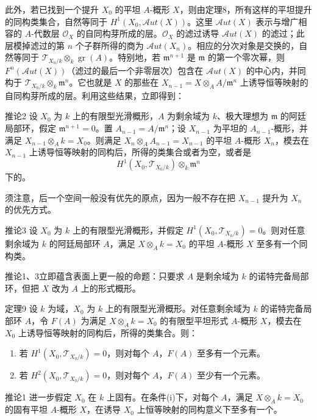 此外，若已找到一个提升 $X_0$ 的平坦 $A$-概形 $X$，则由定理8，所有这样的平坦提升的同构类集合，自然等同于 $H^1(X_0,\mathcal A ut(X))$。这里 $\mathcal A ut(X)$ 表示与增广相容的 $A$-代数层 $\mathcal O_X$ 的自同构芽所成的层。$\mathcal O_X$ 的滤过诱导 $\mathcal A ut(X)$ 的滤过；此层模掉滤过的第 $n$ 个子群所得的商为 $\mathcal A ut(X_n)$。相应的分次对象是交换的，自然等同于 $\mathcal T_{X_0/k}\otimes_k\operatorname{gr}(A)$。特别地，若 $\mathfrak m^{n+1}$ 是 $\mathfrak m$ 的第一个零次幂，则 $F^n(\mathcal A ut(X))$（滤过的最后一个非零层次）包含在 $\mathcal A ut(X)$ 的中心内，并同构于 $\mathcal T_{X_0/k}\otimes_k\mathfrak m^n$。它也就是 $X$ 的那些在 $X_{n-1}=X\otimes_A A/\mathfrak m^n$ 上诱导恒等映射的自同构芽所成的层。利用这些结果，立即得到：
\begin{statement}{推论2}
设 $X_0$ 为 $k$ 上的有限型光滑概形，$A$ 为剩余域为 $k$、极大理想为 $\mathfrak m$ 的阿廷局部环，假定 $\mathfrak m^{n+1}=0$。置 $A_{n-1}=A/\mathfrak m^n$；设 $X_{n-1}$ 为平坦的 $A_{n-1}$-概形，并满足 $X_{n-1}\otimes_Ak=X_0$。则满足 $X_n\otimes_A A_{n-1}=X_{n-1}$ 的平坦 $A$-概形 $X_n$，模去在 $X_{n-1}$ 上诱导恒等映射的同构后，所得的类集合或者为空，或者是
\[
H^1(X_0,\mathcal T_{X_0/k})\otimes_k\mathfrak m^n
\]
下的。
\end{statement}
须注意，后一个空间一般没有优先的原点，因为一般不存在把 $X_{n-1}$ 提升为 $X_n$ 的优先方式。
\begin{statement}{推论3}
设 $X_0$ 为 $k$ 上的有限型光滑概形，并假定 $H^1(X_0,\mathcal T_{X_0/k})=0$。则对任意剩余域为 $k$ 的阿廷局部环 $A$，满足 $X\otimes_Ak=X_0$ 的平坦 $A$-概形 $X$ 至多有一个同构类。
\end{statement}
推论1、3立即蕴含表面上更一般的命题：只要求 $A$ 是剩余域为 $k$ 的诺特完备局部环，但把 $X$ 改为 $A$ 上的形式概形。
\begin{statement}{定理9}
设 $k$ 为域，$X_0$ 为 $k$ 上的有限型光滑概形。对任意剩余域为 $k$ 的诺特完备局部环 $A$，令 $F(A)$ 为满足 $X\otimes_Ak=X_0$ 的有限型平坦形式 $A$-概形 $X$，模去在 $X_0$ 上诱导恒等映射的同构后，所得的类集合。则：
\begin{enumerate}
\item[(i)] 若 $H^1(X_0,\mathcal T_{X_0/k})=0$，则对每个 $A$，$F(A)$ 至多有一个元素。
\item[(ii)] 若 $H^2(X_0,\mathcal T_{X_0/k})=0$，则对每个 $A$，$F(A)$ 至少有一个元素。
\end{enumerate}
\end{statement}
\begin{statement}{推论1}
进一步假定 $X_0$ 在 $k$ 上固有。在条件(i)下，对每个 $A$，满足 $X\otimes_Ak=X_0$ 的固有平坦 $A$-概形 $X$，在诱导 $X_0$ 上恒等映射的同构意义下至多有一个。
\end{statement}
